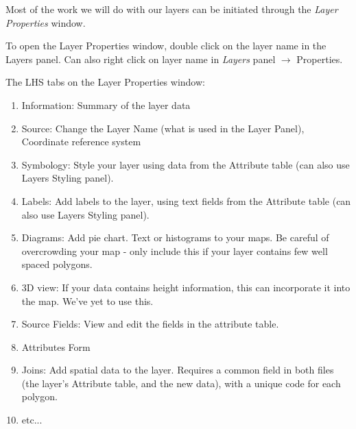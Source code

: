 Most of the work we will do with our layers can be initiated through the \textit{Layer Properties} window.

To open the Layer Properties window, double click on the layer name in the Layers panel. Can also right click on layer name in \textit{Layers} panel $\rightarrow$ Properties.

The LHS tabs on the Layer Properties window:

\begin{enumerate}
	\item
	Information: Summary of the layer data
	\item
	Source: Change the Layer Name (what is used in the Layer Panel), Coordinate reference system
	\item
	Symbology: Style your layer using data from the Attribute table (can also use Layers Styling panel).
	\item
	Labels: Add labels to the layer, using text fields from the Attribute table  (can also use Layers Styling panel).
	\item
	Diagrams: Add pie chart. Text or histograms to your maps. Be careful of overcrowding your map -  only include this if your layer contains few well spaced polygons.
	\item
	3D view: If your data contains height information, this can incorporate it into the map. We’ve yet to use this.
	\item
	Source Fields: View and edit the fields in the attribute table.
	\item
	Attributes Form
	\item
	Joins: Add spatial data to the layer. Requires a common field in both files (the layer’s Attribute table, and the new data), with a unique code for each polygon.
	\item
	etc...
\end{enumerate}

